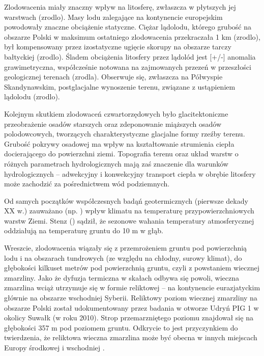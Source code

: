 \documentclass[11.5pt,twoside]{report}
\begin{document}
Zlodowacenia miały znaczny wpływ na litosferę, zwłaszcza w płytszych jej warstwach (zrodlo). Masy lodu zalegające na kontynencie europejskim powodowały znaczne obciążenie statyczne. Ciężar lądolodu, którego grubość na obszarze Polski w maksimum ostatniego zlodowacenia przekraczała 1 km \parencite{Svendsen.2004} (zrodlo), był kompensowany przez izostatyczne ugięcie skorupy na obszarze tarczy bałtyckiej (zrodlo). Śladem obciążenia litosfery przez lądolód jest [+/-] anomalia grawimetryczna, współcześnie notowana na zajmowanych przezeń w przeszłości geologicznej terenach (zrodla). Obserwuje się, zwłaszcza na Półwyspie Skandynawskim, postglacjalne wynoszenie terenu, związane z ustąpieniem lądolodu (zrodlo).

Kolejnym skutkiem zlodowaceń czwartorzędowych było glacitektoniczne przeobrażenie osadów starszych oraz zdeponowanie miąższych osadów polodowcowych, tworzących charakterystyczne glacjalne formy rzeźby terenu. Grubość pokrywy osadowej ma wpływ na kształtowanie strumienia ciepła docierającego do powierzchni ziemi. Topografia terenu oraz układ warstw o różnych parametrach hydrologicznych mają zaś znaczenie dla warunków hydrologicznych – adwekcyjny i konwekcyjny transport ciepła w obrębie litosfery może zachodzić za pośrednictwem wód podziemnych.

Od samych początków współczesnych badąń geotermicznych (pierwsze dekady XX w.) zauważano (np. \cite{Stenz.1936,Rudzki.1909}) wpływ klimatu na temperaturę przypowierzchniowych warstw Ziemi. Stenz (\citeyear{Stenz.1936}) sądził, że sezonowe wahania temperatury atmosferycznej oddziałują na temperaturę gruntu do 10 m w głąb.  

Wreszcie, zlodowacenia wiązały się z przemrożeniem gruntu pod powierzchnią lodu i na obszarach tundrowych (ze względu na chłodny, surowy klimat), do głębokości kilkuset metrów pod powierzchnią gruntu, czyli z powstaniem wiecznej zmarzliny. Jako że dyfuzja termiczna w skałach odbywa się powoli, wieczna zmarzlina wciąż utrzymuje się w formie reliktowej – na kontynencie eurazjatyckim głównie na obszarze wschodniej Syberii. Reliktowy poziom wiecznej zmarzliny na obszarze Polski został udokumentowany przez badania w otworze Udryń PIG 1 w okolicy Suwałk (w roku 2010). Strop przemarzniętego poziomu znajdował się na głębokości 357 m pod poziomem gruntu. Odkrycie to jest przyczynkiem do twierdzenia, że reliktowa wieczna zmarzlina może być obecna w innych miejscach Europy środkowej i wschodniej \parencite{Szewczyk.2017}. 
\end{document}
